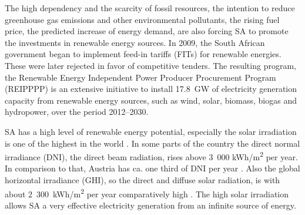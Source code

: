 The high dependency and the scarcity of fossil resources, the intention to reduce greenhouse gas emissions and other environmental pollutants, the rising fuel price, the predicted increase of energy demand, are also forcing SA to promote the investments in renewable energy sources. In 2009, the South African government began to implement feed-in tariffs (FITs) for renewable energies. These were later rejected in favor of competitive tenders. The resulting program, the Renewable Energy Independent Power Producer Procurement Program (REIPPPP) is an extensive initiative to install 17.8~GW of electricity generation capacity from renewable energy sources, such as wind, solar, biomass, biogas and hydropower, over the period 2012–2030. \cite{DEA2015,DoE2013,Eberhard2014}



SA has a high level of renewable energy potential, especially the solar irradiation is one of the highest in the world \cite{IRENA2014}. In some parts of the country the direct normal irradiance (DNI),  the direct beam radiation, rises above 3~000 kWh/m\textsuperscript{2} per year. In comparison to that, Austria has ca. one third of DNI per year \cite{SolarGIS2013a,SolarGIS2013}. Also the global horizontal irradiance (GHI), so the direct and diffuse solar radiation, is with about 2~300~kWh/m\textsuperscript{2} per year comparatively high \cite{SolarGIS2011}. The high solar irradiation allows SA a very effective electricity generation from an infinite source of energy.



